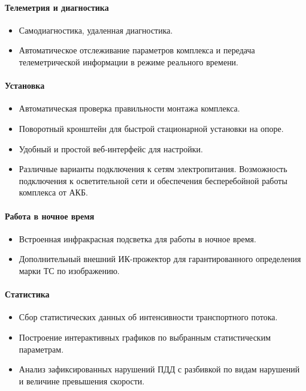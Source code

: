 \documentclass[specification,annotation,times]{itmo-student-thesis}
\begin{document}
	\paragraph{Телеметрия и диагностика}
	\begin{itemize}
		\item Самодиагностика, удаленная диагностика.
		\item Автоматическое отслеживание параметров комплекса и передача телеметрической информации в режиме реального времени.
	\end{itemize}
	
	\paragraph{Установка}
	\begin{itemize}
		\item Автоматическая проверка правильности монтажа комплекса.
		\item Поворотный кронштейн для быстрой стационарной установки на опоре.
		\item Удобный и простой веб-интерфейс для настройки.
		\item Различные варианты подключения к сетям электропитания. Возможность подключения к осветительной сети и обеспечения бесперебойной работы комплекса от АКБ.
	\end{itemize}
	
	\paragraph{Работа в ночное время}
	\begin{itemize}
		\item Встроенная инфракрасная подсветка для работы в ночное время.
		\item Дополнительный внешний ИК-прожектор для гарантированного определения марки ТС по изображению.
	\end{itemize}
	
	\paragraph{Статистика}
	\begin{itemize}
		\item Сбор статистических данных об интенсивности транспортного потока.
		\item Построение интерактивных графиков по выбранным статистическим параметрам.
		\item Анализ зафиксированных нарушений ПДД с разбивкой по видам нарушений и величине превышения скорости.
	\end{itemize}
	
\end{document}
